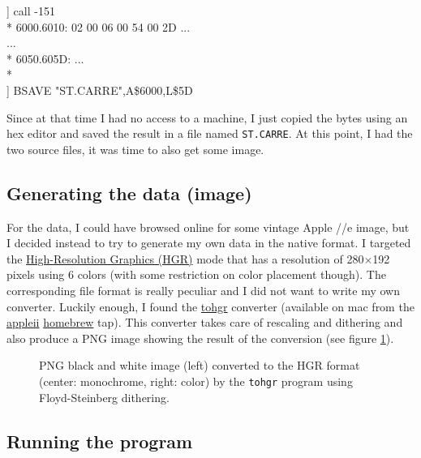 \begin{tt}
] call -151\\
* 6000.6010: 02 00 06 00 54 00 2D ...\\
...\\
* 6050.605D: ...\\
*  \keys{\return}\\
] BSAVE "ST.CARRE",A\$6000,L\$5D\\
\end{tt}

Since at that time I had no access to a machine, I just copied the bytes using
an hex editor and saved the result in a file named {\tt ST.CARRE}. At this
point, I had the two source files, it was time to also get some image.

\subsection*{Generating the data (image)}
For the data, I could have browsed online for some vintage Apple //e image, but
I decided instead to try to generate my own data in the native format. I
targeted
the \href{https://en.wikipedia.org/wiki/Apple_II_graphics}{High-Resolution
Graphics (HGR)} mode that has a resolution of 280$\times$192 pixels using 6
colors (with some restriction on color placement though). The corresponding
file format is really peculiar and I did not want to write my own
converter. Luckily enough, I found
the \href{http://wsxyz.net/tohgr.html}{tohgr} converter (available on mac from
the \href{https://github.com/lifepillar/homebrew-appleii}{appleii} \href{https://brew.sh/}{homebrew}
tap). This converter takes care of rescaling and dithering and also produce a
PNG image showing the result of the conversion (see
figure \ref{fig:conversion}).

\begin{figure}
{%
\fboxsep=0pt
\hfill
{}
\hfill
{}
}
\caption{PNG black and white image (left) converted to the HGR format
(center: monochrome, right: color) by the {\tt tohgr} program using
Floyd-Steinberg dithering.}
\label{fig:conversion}
\end{figure}


\subsection*{Running the program}

